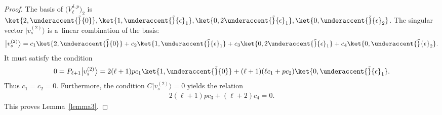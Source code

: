 \documentclass[pdftex]{sigma}
\numberwithin{equation}{section}
\begin{document}
\begin{proof}
The basis of $ \big(V^{\delta,p}_{\ell}\big)_2 $ is $ \ket{2,\underaccent{\tilde}{0}}, \ket{1,\underaccent{\tilde}{\epsilon}_1},
\ket{0,2\underaccent{\tilde}{\epsilon}_1}, \ket{0,\underaccent{\tilde}{\epsilon}_2}$.
The singular vector $ \big|v_s^{(2)}\big\rangle$ is a~linear combination of the basis:
\begin{gather*}
\big|v_s^{(2)}\big\rangle  = c_1 \ket{2,\underaccent{\tilde}{0}} + c_2 \ket{1,\underaccent{\tilde}{\epsilon}_1} + c_3
\ket{0,2\underaccent{\tilde}{\epsilon}_1} + c_4 \ket{0,\underaccent{\tilde}{\epsilon}_2}.
\end{gather*}
It must satisfy the condition
\begin{gather*}
0 = P_{\ell+1} \big|v_s^{(2)}\big\rangle  = 2 (\ell+1)  p   c_1 \ket{1,\underaccent{\tilde}{0}} + (\ell+1)   (\ell  c_1 + p
c_2) \ket{0,\underaccent{\tilde}{\epsilon}_1}.
\end{gather*}
Thus $ c_1 = c_2 = 0$.
Furthermore, the condition $ C \big|v_s^{(2)}\big\rangle  = 0 $ yields the relation
\begin{gather*}
2 (\ell+1)   p   c_3 + (\ell+2) c_4 = 0.
\end{gather*}
This proves Lemma~\ref{lemma3}.
\end{proof}
\end{document}
